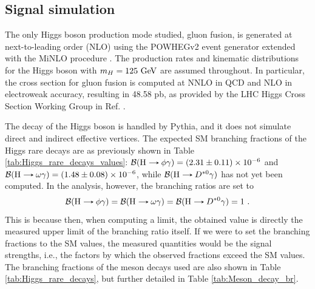 \subsection{Signal simulation}

The only Higgs boson production mode studied, gluon fusion, is generated at next-to-leading order (NLO) using the POWHEGv2 event generator extended with the MiNLO procedure \cite{Hamilton:2012np}. The production rates and kinematic distributions for the Higgs boson with $m_H=125\ \text{GeV}$ are assumed throughout. In particular, the cross section for gluon fusion is computed at NNLO in QCD and NLO in electroweak accuracy, resulting in 48.58 pb, as provided by the LHC Higgs Cross Section Working Group in Ref. \cite{LHCHiggsCrossSectionWorkingGroup:2016ypw}.

The decay of the Higgs boson is handled by Pythia, and it does not simulate direct and indirect effective vertices. The expected SM branching fractions of the Higgs rare decays are as previously shown in Table \ref{tab:Higgs_rare_decays_values}: $\mathcal{B}(\text{H}\decaysto \phi\gamma) = (2.31 \pm 0.11)\times 10^{-6}$ and $\mathcal{B}(\text{H}\decaysto \omega\gamma) = (1.48 \pm 0.08)\times 10^{-6}$, while $\mathcal{B}(\text{H}\decaysto D^{*0}\gamma)$ has not yet been computed. In the analysis, however, the branching ratios are set to
\begin{equation*}
    \mathcal{B}(\text{H}\decaysto \phi\gamma) = \mathcal{B}(\text{H}\decaysto \omega\gamma) = \mathcal{B}(\text{H}\decaysto D^{*0}\gamma) = 1\ .
\end{equation*}
This is because then, when computing a limit, the obtained value is directly the measured upper limit of the branching ratio itself. If we were to set the branching fractions to the SM values, the measured quantities would be the signal strengths, i.e., the factors by which the observed fractions exceed the SM values. The branching fractions of the meson decays used are also shown in Table \ref{tab:Higgs_rare_decays}, but further detailed in Table \ref{tab:Meson_decay_br}.

